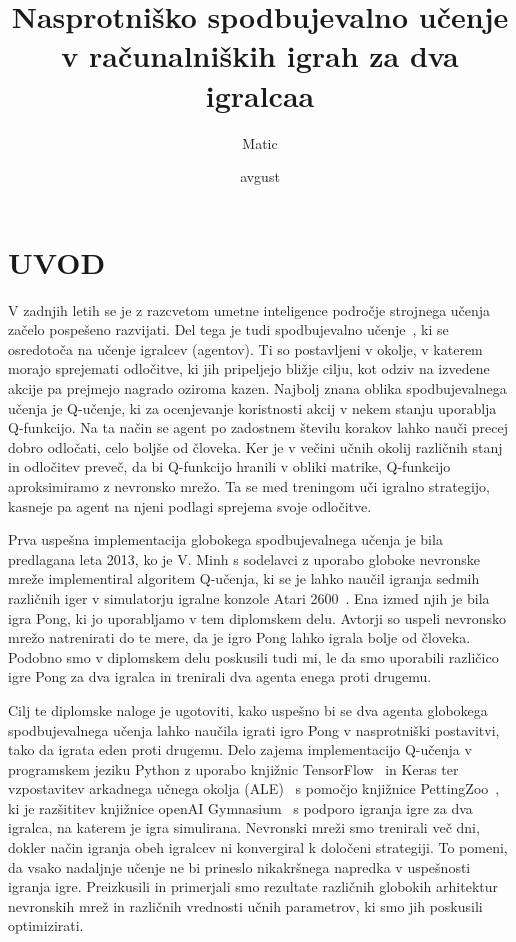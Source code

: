 \documentclass[cover]{thesis}
\title
    {Nasprotniško spodbujevalno učenje v računalniških igrah za dva igralcaa}
    {Adversarial reinforcement learning in playing video games for two players}
    {Nasprotniško spodbujevalno učenje v računalniških igrah za dva igralca}
\author{Matic}{Stare}{M. Stare}
\date{avgust}{2023}
\begin{document}
\chapter{UVOD}

V zadnjih letih se je z razcvetom umetne inteligence področje strojnega učenja začelo pospešeno razvijati. Del tega je tudi spodbujevalno učenje~\cite{sutton2018reinforcement}, ki se osredotoča na učenje igralcev (agentov). Ti so postavljeni v okolje, v katerem morajo sprejemati odločitve, ki jih pripeljejo bližje cilju, kot odziv na izvedene akcije pa prejmejo nagrado oziroma kazen. Najbolj znana oblika spodbujevalnega učenja je Q-učenje, ki za ocenjevanje koristnosti akcij v nekem stanju uporablja Q-funkcijo. Na ta način se agent po zadostnem številu korakov lahko nauči precej dobro odločati, celo boljše od človeka. Ker je v večini učnih okolij različnih stanj in odločitev preveč, da bi Q-funkcijo hranili v obliki matrike, Q-funkcijo aproksimiramo z nevronsko mrežo. Ta se med treningom uči igralno strategijo, kasneje pa agent na njeni podlagi sprejema svoje odločitve.

Prva uspešna implementacija globokega spodbujevalnega učenja je bila predlagana leta 2013, ko je V. Minh s sodelavci z uporabo globoke nevronske mreže implementiral algoritem Q-učenja, ki se je lahko naučil igranja sedmih različnih iger v simulatorju igralne konzole Atari 2600~\cite{mnih2013playing}. Ena izmed njih je bila igra Pong, ki jo uporabljamo v tem diplomskem delu. Avtorji so uspeli nevronsko mrežo natrenirati do te mere, da je igro Pong lahko igrala bolje od človeka. Podobno smo v diplomskem delu poskusili tudi mi, le da smo uporabili različico igre Pong za dva igralca in trenirali dva agenta enega proti drugemu.

Cilj te diplomske naloge je ugotoviti, kako uspešno bi se dva agenta globokega spodbujevalnega učenja lahko naučila igrati igro Pong v nasprotniški postavitvi, tako da igrata eden proti drugemu. Delo zajema implementacijo Q-učenja v programskem jeziku Python z uporabo knjižnic TensorFlow~\cite{tensorflow2015} in Keras ter vzpostavitev arkadnega učnega okolja (ALE)~\cite{bellemare2013arcade} s pomočjo knjižnice PettingZoo~\cite{Terry_PettingZoo_Gym_for}, ki je razšititev knjižnice openAI Gymnasium~\cite{towers_gymnasium_2023} s podporo igranja igre za dva igralca, na katerem je igra simulirana. Nevronski mreži smo trenirali več dni, dokler način igranja obeh igralcev ni konvergiral k določeni strategiji. To pomeni, da vsako nadaljnje učenje ne bi prineslo nikakršnega napredka v uspešnosti igranja igre. Preizkusili in primerjali smo rezultate različnih globokih arhitektur nevronskih mrež in različnih vrednosti učnih parametrov, ki smo jih poskusili optimizirati.
\end{document}
